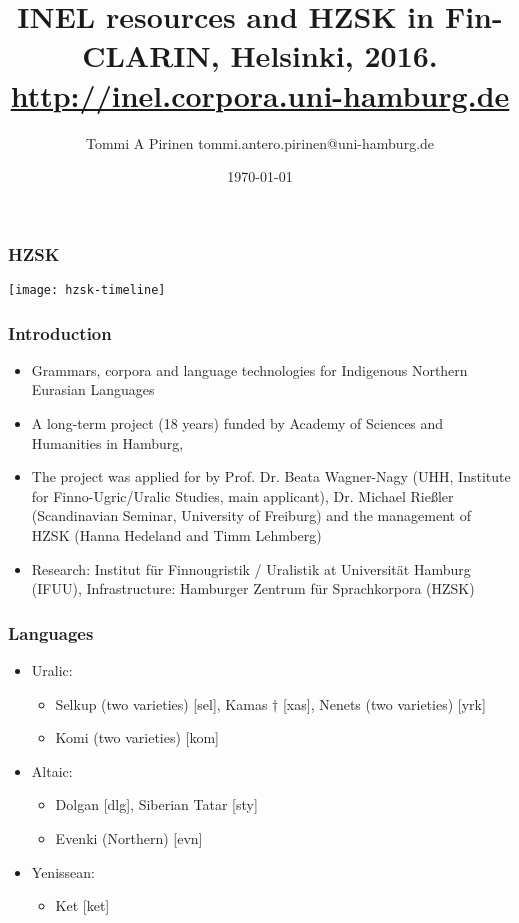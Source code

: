 \documentclass{beamer}
\title{INEL resources and HZSK
\scriptsize{in Fin-CLARIN, Helsinki, 2016.\\
\url{http://inel.corpora.uni-hamburg.de}}}
\author{Tommi A Pirinen \scriptsize \guilsinglleft
tommi.antero.pirinen@uni-hamburg.de \guilsinglright }
\institute{Universität Hamburg}
\date{\today}
\begin{document}

\maketitle


\begin{frame}
    \frametitle{HZSK}
    \texttt{[image: hzsk-timeline]}
\end{frame}


\begin{frame}
    \frametitle{Introduction}
    \begin{itemize}
        \item Grammars, corpora and language technologies for Indigenous
            Northern Eurasian Languages
        \item A long-term project (18 years) funded by Academy of Sciences and
            Humanities in Hamburg,
        \item The project was applied for by Prof. Dr. Beata Wagner-Nagy (UHH, Institute
for Finno-Ugric/Uralic Studies, main applicant), Dr. Michael Rießler
(Scandinavian Seminar, University of Freiburg) and the management of HZSK
(Hanna Hedeland and Timm Lehmberg)
        \item Research: Institut für Finnougristik / Uralistik at Universität
            Hamburg (IFUU), Infrastructure: Hamburger Zentrum für
            Sprachkorpora (HZSK)
    \end{itemize}
\end{frame}

\begin{frame}
    \frametitle{Languages}
    \begin{itemize}
        \item Uralic:
        \begin{itemize}
                \item Selkup (two varieties) [sel], Kamas $\dagger$ [xas],
                    Nenets (two varieties) [yrk]
                \item Komi (two varieties) [kom]
        \end{itemize}
        \item Altaic:
        \begin{itemize}
            \item Dolgan [dlg], Siberian Tatar [sty]
            \item Evenki (Northern) [evn]
        \end{itemize}
        \item Yenissean:
        \begin{itemize}
            \item Ket [ket]
        \end{itemize}
    \end{itemize}
\end{frame}
\end{document}
